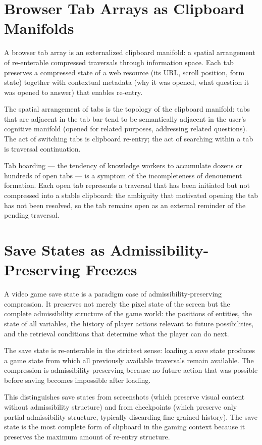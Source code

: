 \documentclass[12pt,oneside]{book}
\theoremstyle{plain}
\theoremstyle{definition}
\theoremstyle{plain}
\begin{document}
\section{Browser Tab Arrays as Clipboard Manifolds}

A browser tab array is an externalized clipboard manifold: a spatial arrangement of re-enterable compressed traversals through information space. Each tab preserves a compressed state of a web resource (its URL, scroll position, form state) together with contextual metadata (why it was opened, what question it was opened to answer) that enables re-entry.

The spatial arrangement of tabs is the topology of the clipboard manifold: tabs that are adjacent in the tab bar tend to be semantically adjacent in the user's cognitive manifold (opened for related purposes, addressing related questions). The act of switching tabs is clipboard re-entry; the act of searching within a tab is traversal continuation.

Tab hoarding — the tendency of knowledge workers to accumulate dozens or hundreds of open tabs — is a symptom of the incompleteness of denouement formation. Each open tab represents a traversal that has been initiated but not compressed into a stable clipboard: the ambiguity that motivated opening the tab has not been resolved, so the tab remains open as an external reminder of the pending traversal.

\section{Save States as Admissibility-Preserving Freezes}

A video game save state is a paradigm case of admissibility-preserving compression. It preserves not merely the pixel state of the screen but the complete admissibility structure of the game world: the positions of entities, the state of all variables, the history of player actions relevant to future possibilities, and the retrieval conditions that determine what the player can do next.

The save state is re-enterable in the strictest sense: loading a save state produces a game state from which all previously available traversals remain available. The compression is admissibility-preserving because no future action that was possible before saving becomes impossible after loading.

This distinguishes save states from screenshots (which preserve visual content without admissibility structure) and from checkpoints (which preserve only partial admissibility structure, typically discarding fine-grained history). The save state is the most complete form of clipboard in the gaming context because it preserves the maximum amount of re-entry structure.
\end{document}
